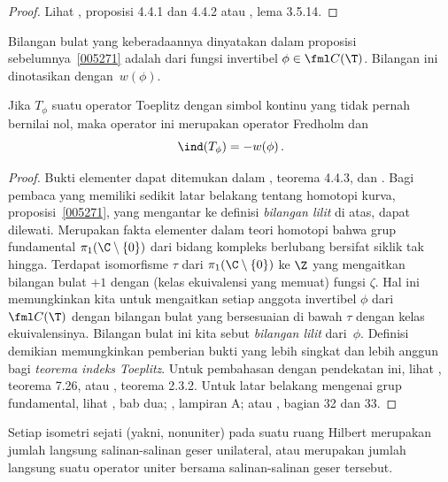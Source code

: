 \begin{proof} Lihat \cite{Arveson:2002}, proposisi 4.4.1 dan 4.4.2 atau \cite{Murphy:1990},
lema 3.5.14. \ns
\end{proof}

\begin{defn} Bilangan bulat yang keberadaannya dinyatakan dalam proposisi sebelumnya~\ref{005271}
adalah
 dari fungsi invertibel $\phi \in \fml C(\T)$. Bilangan ini dinotasikan
dengan~$w(\phi)$.
\end{defn}

\begin{thm}\label{005274}
Jika $T_\phi$ suatu operator Toeplitz dengan simbol kontinu yang tidak pernah bernilai nol, maka operator ini
merupakan operator Fredholm dan
   \[ \ind(T_\phi) = -w(\phi)\,. \]
\end{thm}

\begin{proof} Bukti elementer dapat ditemukan dalam \cite{Arveson:2002}, teorema 4.4.3, dan
\cite{Murphy:1990}. Bagi pembaca yang memiliki sedikit latar belakang tentang homotopi kurva,
proposisi~\ref{005271}, yang mengantar ke definisi \emph{bilangan lilit} di atas,
dapat dilewati. Merupakan fakta elementer dalam teori homotopi bahwa grup fundamental
$\pi_1(\C \setminus \{0\})$ dari bidang kompleks berlubang bersifat siklik tak hingga. Terdapat
isomorfisme $\tau$ dari $\pi_1(\C \setminus \{0\})$ ke $\Z$ yang mengaitkan bilangan bulat $+1$
dengan (kelas ekuivalensi yang memuat) fungsi $\zeta$. Hal ini memungkinkan kita untuk
mengaitkan setiap anggota invertibel $\phi$ dari $\fml C(\T)$ dengan bilangan bulat yang bersesuaian
di bawah $\tau$ dengan kelas ekuivalensinya. Bilangan bulat ini kita sebut
\emph{bilangan lilit} dari~$\phi$. Definisi demikian memungkinkan pemberian bukti yang lebih singkat
dan lebih anggun bagi \emph{teorema indeks Toeplitz}. Untuk pembahasan dengan pendekatan ini,
lihat \cite{Douglas:1972}, teorema 7.26, atau \cite{HigsonR:2000}, teorema 2.3.2. Untuk
latar belakang mengenai grup fundamental, lihat \cite{Massey:1967}, bab dua;
\cite{Wallace:1970}, lampiran A; atau \cite{Willard:1968}, bagian 32 dan 33. \ns
\end{proof}

\begin{thm}
Setiap
isometri sejati (yakni, nonuniter) pada suatu ruang Hilbert merupakan jumlah langsung salinan-salinan
geser unilateral, atau merupakan jumlah langsung suatu operator uniter bersama salinan-salinan
geser tersebut.
\end{thm}

